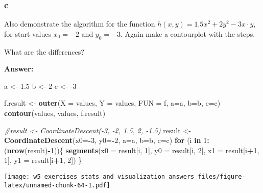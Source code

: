 \documentclass[]{article}
\newenvironment{Shaded}{\begin{snugshade}}{\end{snugshade}}
\newcommand{\CommentTok}[1]{\textcolor[rgb]{0.56,0.35,0.01}{\textit{#1}}}
\newcommand{\ControlFlowTok}[1]{\textcolor[rgb]{0.13,0.29,0.53}{\textbf{#1}}}
\newcommand{\DataTypeTok}[1]{\textcolor[rgb]{0.13,0.29,0.53}{#1}}
\newcommand{\DecValTok}[1]{\textcolor[rgb]{0.00,0.00,0.81}{#1}}
\newcommand{\FloatTok}[1]{\textcolor[rgb]{0.00,0.00,0.81}{#1}}
\newcommand{\KeywordTok}[1]{\textcolor[rgb]{0.13,0.29,0.53}{\textbf{#1}}}
\newcommand{\NormalTok}[1]{#1}
\newcommand{\OperatorTok}[1]{\textcolor[rgb]{0.81,0.36,0.00}{\textbf{#1}}}
\newcommand{\StringTok}[1]{\textcolor[rgb]{0.31,0.60,0.02}{#1}}
\begin{document}
\hypertarget{c-11}{%
\subsubsection{c}\label{c-11}}

Also demonstrate the algorithm for the function
\(h(x, y) = 1.5x^2 + 2y^2 - 3x\cdot y\), for start values \(x_0 = -2\)
and \(y_0 = -3\). Again make a contourplot with the steps.

What are the differences?

\textbf{Answer:}

\begin{Shaded}
\begin{Highlighting}[]
\NormalTok{a <-}\StringTok{ }\FloatTok{1.5}
\NormalTok{b <-}\StringTok{ }\DecValTok{2}
\NormalTok{c <-}\StringTok{ }\DecValTok{-3}

\NormalTok{f.result <-}\StringTok{ }\KeywordTok{outer}\NormalTok{(}\DataTypeTok{X =}\NormalTok{ values, }\DataTypeTok{Y =}\NormalTok{ values, }\DataTypeTok{FUN =}\NormalTok{ f, }\DataTypeTok{a=}\NormalTok{a, }\DataTypeTok{b=}\NormalTok{b, }\DataTypeTok{c=}\NormalTok{c)}
\KeywordTok{contour}\NormalTok{(values, values, f.result)}

\CommentTok{#result <- CoordinateDescent(-3, -2, 1.5, 2, -1.5)}
\NormalTok{result <-}\StringTok{ }\KeywordTok{CoordinateDescent}\NormalTok{(}\DataTypeTok{x0=}\OperatorTok{-}\DecValTok{3}\NormalTok{, }\DataTypeTok{y0=}\OperatorTok{-}\DecValTok{2}\NormalTok{, }\DataTypeTok{a=}\NormalTok{a, }\DataTypeTok{b=}\NormalTok{b, }\DataTypeTok{c=}\NormalTok{c)}
\ControlFlowTok{for}\NormalTok{ (i }\ControlFlowTok{in} \DecValTok{1}\OperatorTok{:}\NormalTok{(}\KeywordTok{nrow}\NormalTok{(result)}\OperatorTok{-}\DecValTok{1}\NormalTok{))\{}
  \KeywordTok{segments}\NormalTok{(}\DataTypeTok{x0 =}\NormalTok{ result[i, }\DecValTok{1}\NormalTok{], }\DataTypeTok{y0 =}\NormalTok{ result[i, }\DecValTok{2}\NormalTok{], }\DataTypeTok{x1 =}\NormalTok{ result[i}\OperatorTok{+}\DecValTok{1}\NormalTok{, }\DecValTok{1}\NormalTok{], }\DataTypeTok{y1 =}\NormalTok{ result[i}\OperatorTok{+}\DecValTok{1}\NormalTok{, }\DecValTok{2}\NormalTok{])}
\NormalTok{\}}
\end{Highlighting}
\end{Shaded}

\texttt{[image: w5\_exercises\_stats\_and\_visualization\_answers\_files/figure-latex/unnamed-chunk-64-1.pdf]}
\end{document}
